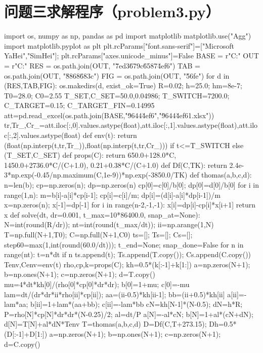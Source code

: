 \section{问题三求解程序（problem3.py）}
\begin{codelisting}
import os, numpy as np, pandas as pd
import matplotlib
matplotlib.use("Agg")
import matplotlib.pyplot as plt
plt.rcParams["font.sans-serif"]=["Microsoft YaHei","SimHei"]; plt.rcParams["axes.unicode_minus"]=False
BASE = r"C:\Users{}\Desktop{}"
OUT  = r"C:\Users{}\Desktop\A"
RES  = os.path.join(OUT, "\u7ed3\u679c\u6587\u4ef6")
TAB  = os.path.join(OUT, "\u8868\u683c")
FIG  = os.path.join(OUT, "\u56fe")
for d in (RES,TAB,FIG): os.makedirs(d, exist_ok=True)
R=0.02; h=25.0; hm=8e-7; T0=28.0; C0=2.55
T_SET,C_SET=50.0,0.04986; T_SWITCH=7200.0; C_TARGET=0.15; C_TARGET_FIN=0.14995
att=pd.read_excel(os.path.join(BASE,"\u9644\u4ef6","\u9644\u4ef61.xlsx"))
tr,Tr_,Cr_=att.iloc[:,0].values.astype(float),att.iloc[:,1].values.astype(float),att.iloc[:,2].values.astype(float)
def env(t):
    return (float(np.interp(t,tr,Tr_)),float(np.interp(t,tr,Cr_))) if t<=T_SWITCH else (T_SET,C_SET)
def props(C):
    return 650.0+128.0*C, 1450.0+2736.0*C/(C+1.0), 0.21+0.38*C/(C+1.0)
def Df(C,TK):
    return 2.4e-3*np.exp(-0.45/np.maximum(C,1e-9))*np.exp(-3850.0/TK)
def thomas(a,b,c,d):
    n=len(b); cp=np.zeros(n); dp=np.zeros(n)
    cp[0]=c[0]/b[0]; dp[0]=d[0]/b[0]
    for i in range(1,n):
        m=b[i]-a[i]*cp[i-1]; cp[i]=c[i]/m; dp[i]=(d[i]-a[i]*dp[i-1])/m
    x=np.zeros(n); x[-1]=dp[-1]
    for i in range(n-2,-1,-1): x[i]=dp[i]-cp[i]*x[i+1]
    return x
def solve(dt, dr=0.001, t_max=10*86400.0, snap_at=None):
    N=int(round(R/dr)); nt=int(round(t_max/dt)); ii=np.arange(1,N)
    T=np.full(N+1,T0); C=np.full(N+1,C0)
    ts=[]; Ts=[]; Cs=[]; step60=max(1,int(round(60.0/dt))); t_end=None; snap_done=False
    for n in range(nt):
        t=n*dt
        if n %
            ts.append(t); Ts.append(T.copy()); Cs.append(C.copy())
        Tenv,Cenv=env(t)
        rho,cp,k=props(C); kh=0.5*(k[:-1]+k[1:])
        a=np.zeros(N+1); b=np.ones(N+1); c=np.zeros(N+1); d=T.copy()
        mu=4*dt*kh[0]/(rho[0]*cp[0]*dr*dr); b[0]=1+mu; c[0]=-mu
        lam=dt/(dr*dr*ii*rho[ii]*cp[ii]); aa=(ii-0.5)*kh[ii-1]; bb=(ii+0.5)*kh[ii]
        a[ii]=-lam*aa; b[ii]=1+lam*(aa+bb); c[ii]=-lam*bb
        cN=kh[N-1]*(N-0.5); dN=h*R; P=rho[N]*cp[N]*dr*dr*(N-0.25)/2; al=dt/P
        a[N]=-al*cN; b[N]=1+al*(cN+dN); d[N]=T[N]+al*dN*Tenv
        T=thomas(a,b,c,d)
        D=Df(C,T+273.15); Dh=0.5*(D[:-1]+D[1:])
        a=np.zeros(N+1); b=np.ones(N+1); c=np.zeros(N+1); d=C.copy()

\end{codelisting}
